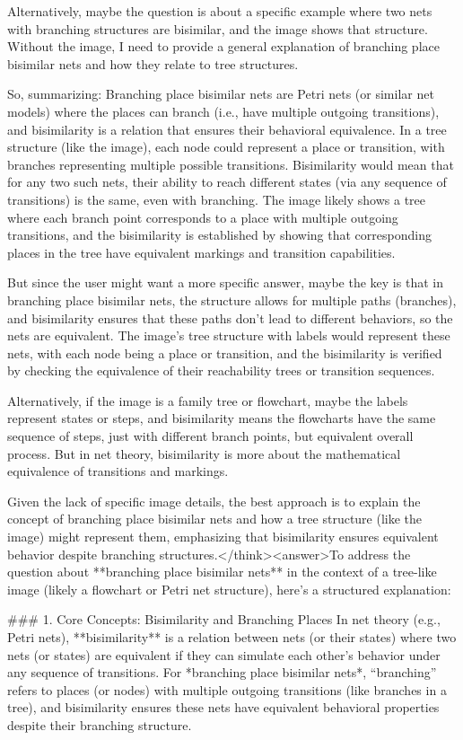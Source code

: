 Alternatively, maybe the question is about a specific example where two nets with branching structures are bisimilar, and the image shows that structure. Without the image, I need to provide a general explanation of branching place bisimilar nets and how they relate to tree structures.

So, summarizing: Branching place bisimilar nets are Petri nets (or similar net models) where the places can branch (i.e., have multiple outgoing transitions), and bisimilarity is a relation that ensures their behavioral equivalence. In a tree structure (like the image), each node could represent a place or transition, with branches representing multiple possible transitions. Bisimilarity would mean that for any two such nets, their ability to reach different states (via any sequence of transitions) is the same, even with branching. The image likely shows a tree where each branch point corresponds to a place with multiple outgoing transitions, and the bisimilarity is established by showing that corresponding places in the tree have equivalent markings and transition capabilities.

But since the user might want a more specific answer, maybe the key is that in branching place bisimilar nets, the structure allows for multiple paths (branches), and bisimilarity ensures that these paths don't lead to different behaviors, so the nets are equivalent. The image's tree structure with labels would represent these nets, with each node being a place or transition, and the bisimilarity is verified by checking the equivalence of their reachability trees or transition sequences.

Alternatively, if the image is a family tree or flowchart, maybe the labels represent states or steps, and bisimilarity means the flowcharts have the same sequence of steps, just with different branch points, but equivalent overall process. But in net theory, bisimilarity is more about the mathematical equivalence of transitions and markings.

Given the lack of specific image details, the best approach is to explain the concept of branching place bisimilar nets and how a tree structure (like the image) might represent them, emphasizing that bisimilarity ensures equivalent behavior despite branching structures.</think><answer>To address the question about **branching place bisimilar nets** in the context of a tree-like image (likely a flowchart or Petri net structure), here’s a structured explanation:  


### 1. Core Concepts: Bisimilarity and Branching Places  
In net theory (e.g., Petri nets), **bisimilarity** is a relation between nets (or their states) where two nets (or states) are equivalent if they can simulate each other’s behavior under any sequence of transitions. For *branching place bisimilar nets*, “branching” refers to places (or nodes) with multiple outgoing transitions (like branches in a tree), and bisimilarity ensures these nets have equivalent behavioral properties despite their branching structure.  


